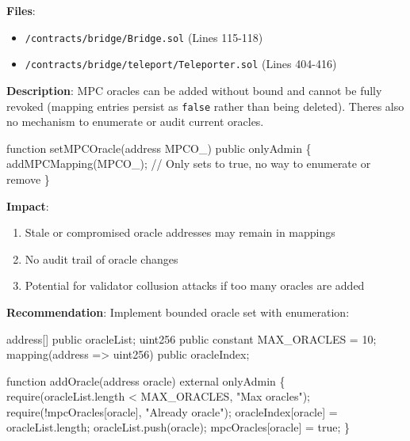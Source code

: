 \documentclass[
]{article}
\newenvironment{Shaded}{}{}
\newcommand{\NormalTok}[1]{#1}
\providecommand{\tightlist}{%
  \setlength{\itemsep}{0pt}\setlength{\parskip}{0pt}}
\begin{document}
\textbf{Files}:

\begin{itemize}
\tightlist
\item
  \texttt{/contracts/bridge/Bridge.sol} (Lines 115-118)
\item
  \texttt{/contracts/bridge/teleport/Teleporter.sol} (Lines 404-416)
\end{itemize}

\textbf{Description}: MPC oracles can be added without bound and cannot
be fully revoked (mapping entries persist as \texttt{false} rather than
being deleted). There\textquotesingle s also no mechanism to enumerate
or audit current oracles.

\begin{Shaded}
\begin{Highlighting}[]
\NormalTok{function setMPCOracle(address MPCO\_) public onlyAdmin \{}
\NormalTok{    addMPCMapping(MPCO\_);  // Only sets to true, no way to enumerate or remove}
\NormalTok{\}}
\end{Highlighting}
\end{Shaded}

\textbf{Impact}:

\begin{enumerate}
\def\labelenumi{\arabic{enumi}.}
\tightlist
\item
  Stale or compromised oracle addresses may remain in mappings
\item
  No audit trail of oracle changes
\item
  Potential for validator collusion attacks if too many oracles are
  added
\end{enumerate}

\textbf{Recommendation}: Implement bounded oracle set with enumeration:

\begin{Shaded}
\begin{Highlighting}[]
\NormalTok{address[] public oracleList;}
\NormalTok{uint256 public constant MAX\_ORACLES = 10;}
\NormalTok{mapping(address =\textgreater{} uint256) public oracleIndex;}

\NormalTok{function addOracle(address oracle) external onlyAdmin \{}
\NormalTok{    require(oracleList.length \textless{} MAX\_ORACLES, "Max oracles");}
\NormalTok{    require(!mpcOracles[oracle], "Already oracle");}
\NormalTok{    oracleIndex[oracle] = oracleList.length;}
\NormalTok{    oracleList.push(oracle);}
\NormalTok{    mpcOracles[oracle] = true;}
\NormalTok{\}}
\end{Highlighting}
\end{Shaded}
\end{document}
